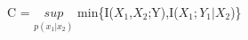 \documentclass[preview]{standalone}
\begin{document}
\begin{center}
C = $\underset{p(x_1|x_2)}{sup}$ min\{I($X_1$,$X_2$;Y),I($X_1;Y_1|X_2$)\}
\end{center}
\end{document}
